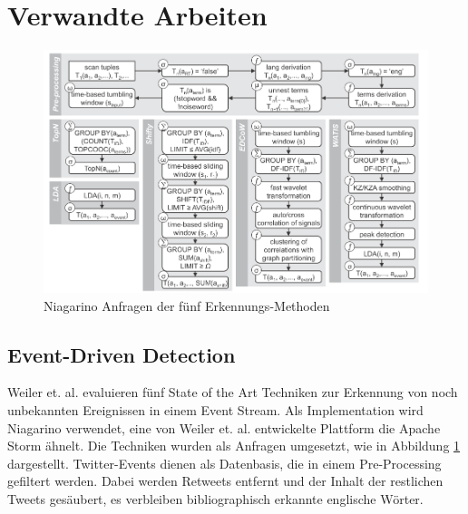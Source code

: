 \section{Verwandte Arbeiten}

\begin{figure}
    \includegraphics[width=\textwidth]{images/eventdetect.png}
    \caption{Niagarino Anfragen der fünf Erkennungs-Methoden}
    \label{fig:eventdetect}
\end{figure}

\subsection{Event-Driven Detection}
Weiler et. al. \cite{weiler2016evaluation} evaluieren fünf State of the Art Techniken zur Erkennung von noch unbekannten Ereignissen in einem Event Stream. Als Implementation wird Niagarino verwendet, eine von Weiler et. al. entwickelte Plattform die Apache Storm ähnelt. Die Techniken wurden als Anfragen umgesetzt, wie in Abbildung \ref{fig:eventdetect} dargestellt. Twitter-Events dienen als Datenbasis, die in einem Pre-Processing gefiltert werden. Dabei werden Retweets entfernt und der Inhalt der restlichen Tweets gesäubert, es verbleiben bibliographisch erkannte englische Wörter. 

